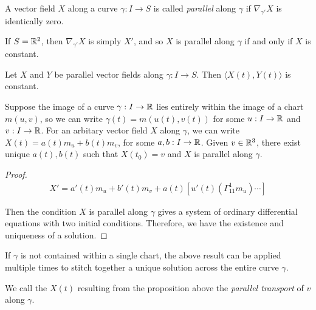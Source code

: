 \begin{defn}
    A vector field $X$ along a curve $\gamma: I \to S$ is called \emph{parallel} along $\gamma$ if $\nabla_{\gamma'}X$ is identically zero.
\end{defn}

\begin{exmp}
    If $S = \mathbb{R}^2$, then $\nabla_{\gamma'}X$ is simply $X'$, and so $X$ is parallel along $\gamma$ if and only if $X$ is constant.
\end{exmp}

\begin{prop}
    Let $X$ and $Y$ be parallel vector fields along $\gamma: I \to S$. Then $\langle X(t), Y(t)\rangle$ is constant.
\end{prop}

\begin{prop}
    Suppose the image of a curve $\gamma: I \to \mathbb{R}$ lies entirely within the image of a chart $m(u, v)$, so we can write $\gamma(t) = m(u(t), v(t))$ for some $u: I \to \mathbb{R}$ and $v: I \to \mathbb{R}$. For an arbitary vector field $X$ along $\gamma$, we can write $X(t) = a(t)m_u + b(t)m_v$, for some $a, b: I \to \mathbb{R}$. Given $v \in \mathbb{R}^3$, there exist unique $a(t), b(t)$ such that $X(t_0) = v$ and $X$ is parallel along $\gamma$.
\end{prop}

\begin{proof}
    \begin{align*}
        X' = a'(t)m_u + b'(t)m_v + a(t)\left[u'(t)\left(\Gamma_{11}^{1}m_u\right) \cdots\right]
    \end{align*}

    Then the condition $X$ is parallel along $\gamma$ gives a system of ordinary differential equations with two initial conditions. Therefore, we have the existence and uniqueness of a solution.
\end{proof}

\begin{rmk}
    If $\gamma$ is not contained within a single chart, the above result can be applied multiple times to stitch together a unique solution across the entire curve $\gamma$.
\end{rmk}

\begin{defn}
    We call the $X(t)$ resulting from the proposition above the \emph{parallel transport} of $v$ along $\gamma$.
\end{defn}

